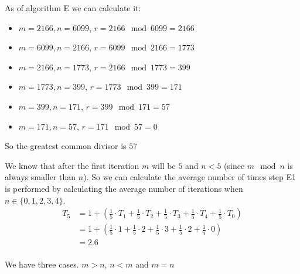 \label{ex:section1.1-4}
As of algorithm E we can calculate it:
\begin{itemize}
    \item $m = 2166, n = 6099$, $r = 2166 \mod 6099 = 2166$
    \item $m = 6099, n = 2166$, $r = 6099 \mod 2166 = 1773$
    \item $m = 2166, n = 1773$, $r = 2166 \mod 1773 = 399$
    \item $m = 1773, n = 399$, $r = 1773 \mod 399 = 171$
    \item $m = 399, n = 171$, $r = 399 \mod 171 = 57$
    \item $m = 171, n = 57$, $r = 171 \mod 57 = 0$
\end{itemize}
So the greatest common divisor is $57$

\label{ex:section1.1-5}

\label{ex:section1.1-6}
We know that after the first iteration $m$ will be $5$ and $n < 5$ (since $m \mod n$ is always smaller than $n$). So we can calculate the average number of times step E1 is performed by calculating the average number of iterations when $n \in \{0,1,2,3,4\}$.
\begin{align*}
    T_5 & = 1 + \left(\frac{1}{5} \cdot T_1 + \frac{1}{5} \cdot T_2 + \frac{1}{5} \cdot T_3 + \frac{1}{5} \cdot T_4 + \frac{1}{5} \cdot T_0 \right) \\
        & = 1 + \left(\frac{1}{5} \cdot 1 +   \frac{1}{5} \cdot 2 +   \frac{1}{5} \cdot 3 +   \frac{1}{5} \cdot 2   + \frac{1}{5} \cdot 0\right)    \\
        & = 2.6                                                                                                                                     \\
\end{align*}

We have three cases. $m > n$,  $n < m$ and $m = n$ \\

